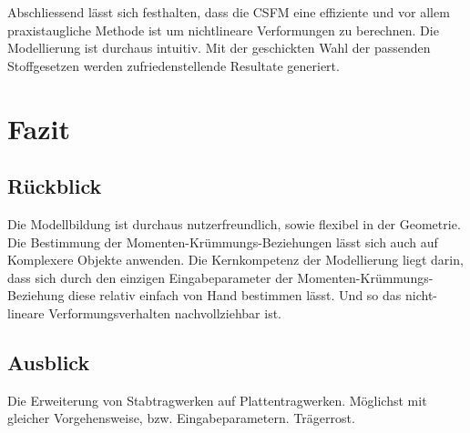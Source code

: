 \documentclass[
  11pt,
  letterpaper,
]{scrreprt}
\begin{document}
Abschliessend lässt sich festhalten, dass die CSFM eine effiziente und
vor allem praxistaugliche Methode ist um nichtlineare Verformungen zu
berechnen. Die Modellierung ist durchaus intuitiv. Mit der geschickten
Wahl der passenden Stoffgesetzen werden zufriedenstellende Resultate
generiert.


\chapter{Fazit}\label{fazit}

\section{Rückblick}\label{ruxfcckblick}

Die Modellbildung ist durchaus nutzerfreundlich, sowie flexibel in der
Geometrie. Die Bestimmung der Momenten-Krümmungs-Beziehungen lässt sich
auch auf Komplexere Objekte anwenden. Die Kernkompetenz der Modellierung
liegt darin, dass sich durch den einzigen Eingabeparameter der
Momenten-Krümmungs-Beziehung diese relativ einfach von Hand bestimmen
lässt. Und so das nicht-lineare Verformungsverhalten nachvollziehbar
ist.

\section{Ausblick}\label{ausblick}

Die Erweiterung von Stabtragwerken auf Plattentragwerken. Möglichst mit
gleicher Vorgehensweise, bzw. Eingabeparametern. Trägerrost.

\newpage{}

\end{document}
